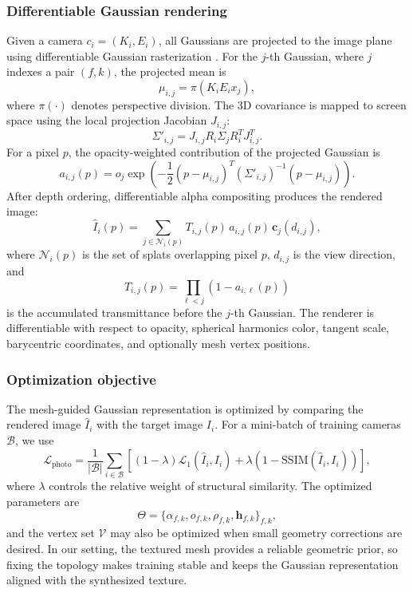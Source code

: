 \documentclass{article}
\begin{document}
\subsubsection{Differentiable Gaussian rendering}
Given a camera $c_i=(K_i,E_i)$, all Gaussians are projected to the image plane using differentiable Gaussian rasterization \cite{kerbl3Dgaussians}. For the $j$-th Gaussian, where $j$ indexes a pair $(f,k)$, the projected mean is
\begin{equation}
\mu_{i,j}
=
\pi\!\left(K_iE_i x_j\right),
\end{equation}
where $\pi(\cdot)$ denotes perspective division. The 3D covariance is mapped to screen space using the local projection Jacobian $J_{i,j}$:
\begin{equation}
\Sigma'_{i,j}
=
J_{i,j}R_i\Sigma_jR_i^{T}J_{i,j}^{T}.
\end{equation}
For a pixel $p$, the opacity-weighted contribution of the projected Gaussian is
\begin{equation}
a_{i,j}(p)
=
o_j
\exp\!\left(
-\frac{1}{2}(p-\mu_{i,j})^T
(\Sigma'_{i,j})^{-1}
(p-\mu_{i,j})
\right).
\end{equation}
After depth ordering, differentiable alpha compositing produces the rendered image:
\begin{equation}
\hat{I}_i(p)
=
\sum_{j\in\mathcal{N}_i(p)}
T_{i,j}(p)\,
a_{i,j}(p)\,
\mathbf{c}_j(d_{i,j}),
\end{equation}
where $\mathcal{N}_i(p)$ is the set of splats overlapping pixel $p$, $d_{i,j}$ is the view direction, and
\begin{equation}
T_{i,j}(p)
=
\prod_{\ell<j}
\left(1-a_{i,\ell}(p)\right)
\end{equation}
is the accumulated transmittance before the $j$-th Gaussian. The renderer is differentiable with respect to opacity, spherical harmonics color, tangent scale, barycentric coordinates, and optionally mesh vertex positions.

\subsubsection{Optimization objective}
The mesh-guided Gaussian representation is optimized by comparing the rendered image $\hat{I}_i$ with the target image $I_i$. For a mini-batch of training cameras $\mathcal{B}$, we use
\begin{equation}
\mathcal{L}_{\mathrm{photo}}
=
\frac{1}{|\mathcal{B}|}
\sum_{i\in\mathcal{B}}
\left[
(1-\lambda)\mathcal{L}_{1}(\hat{I}_i,I_i)
+
\lambda\left(1-\mathrm{SSIM}(\hat{I}_i,I_i)\right)
\right],
\end{equation}
where $\lambda$ controls the relative weight of structural similarity. The optimized parameters are
\begin{equation}
\Theta=
\{\alpha_{f,k},o_{f,k},\rho_{f,k},\mathbf{h}_{f,k}\}_{f,k},
\end{equation}
and the vertex set $\mathcal{V}$ may also be optimized when small geometry corrections are desired. In our setting, the textured mesh provides a reliable geometric prior, so fixing the topology makes training stable and keeps the Gaussian representation aligned with the synthesized texture.
\end{document}

